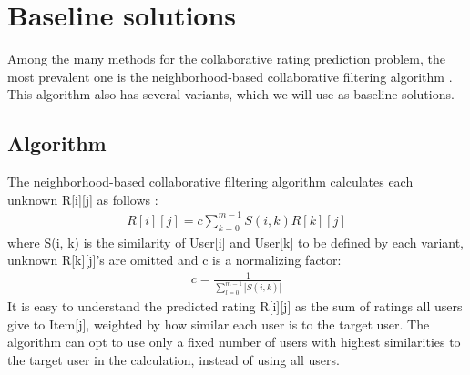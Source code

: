 \documentclass[sigconf]{acmart}
\begin{document}
\section{Baseline solutions}
Among the many methods for the collaborative rating prediction problem,
the most prevalent one is the neighborhood-based collaborative filtering 
algorithm \cite{su2009survey}.
This algorithm also has several variants,
which we will use as baseline solutions.

\subsection{Algorithm}
The neighborhood-based collaborative filtering algorithm calculates each 
unknown R[i][j] as 
follows \cite{su2009survey}:
\begin{align*}
R[i][j] = c \sum_{k = 0}^{m-1} S(i, k) R[k][j]
\end{align*}
where S(i, k) is the similarity of User[i] and User[k] to be defined by each 
variant,
unknown R[k][j]'s are omitted and c is a normalizing factor:
\begin{align*}
	c = \frac{1}{\sum_{l = 0}^{m - 1} |S(i, k)|}
\end{align*}
It is easy to understand the predicted rating R[i][j] as the sum of ratings all 
users give to Item[j],
weighted by how similar each user is to the target user.
The algorithm can opt to use only a fixed number of users with highest 
similarities to the target user in the calculation, instead of using all users.
\end{document}

